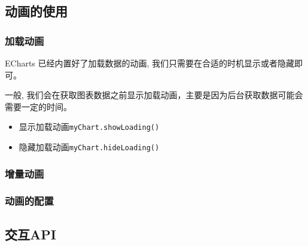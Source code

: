 \subsection{动画的使用}

\subsubsection{加载动画}
ECharts 已经内置好了加载数据的动画, 我们只需要在合适的时机显示或者隐藏即可。

一般, 我们会在获取图表数据之前显示加载动画，主要是因为后台获取数据可能会需要一定的时间。
\begin{itemize}
    \item 显示加载动画\verb|myChart.showLoading()|
    \item 隐藏加载动画\verb|myChart.hideLoading()|
\end{itemize}

\subsubsection{增量动画}
\subsubsection{动画的配置}
\subsection{交互API}
